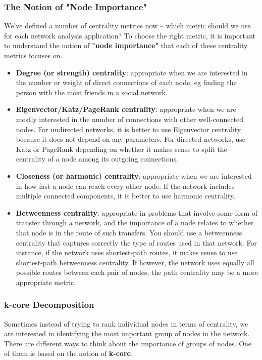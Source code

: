 \documentclass[11pt]{scrartcl} %
\begin{document}
\subsubsection{The Notion of "Node Importance"}
We've defined a number of centrality metrics now -- which metric should we use for each network analysis application? To choose the right metric, it is important to understand the notion of \textbf{"node importance"} that each of these centrality metrics focuses on.

\begin{itemize}
	\item \textbf{Degree (or strength) centrality}: appropriate when we are interested in the number or weight of direct connections of each node, eg finding the person with the most friends in a social network.
	\item \textbf{Eigenvector/Katz/PageRank centrality}: appropriate when we are mostly interested in the number of connections with other well-connected nodes. For undirected networks, it is better to use Eigenvector centrality because it does not depend on any parameters. For directed networks, use Katz or PageRank depending on whether it makes sense to split the centrality of a node among its outgoing connections.
	\item \textbf{Closeness (or harmonic) centrality}: appropriate when we are interested in how fast a node can reach every other node. If the network includes multiple connected components, it is better to use harmonic centrality.
	\item \textbf{Betweenness centrality}: appropriate in problems that involve some form of transfer through a network, and the importance of a node relates to whether that node is in the route of such transfers. You should use a betweenness centrality that captures correctly the type of routes used in that network. For instance, if the network uses shortest-path routes, it makes sense to use shortest-path betweenness centrality. If however, the network uses equally all possible routes between each pair of nodes, the path centrality may be a more appropriate metric.
\end{itemize}

\subsubsection{k-core Decomposition}
Sometimes instead of trying to rank individual nodes in terms of centrality, we are interested in identifying the most important group of nodes in the network. There are different ways to think about the importance of groups of nodes. One of them is based on the notion of \textbf{k-core}.
\end{document}

